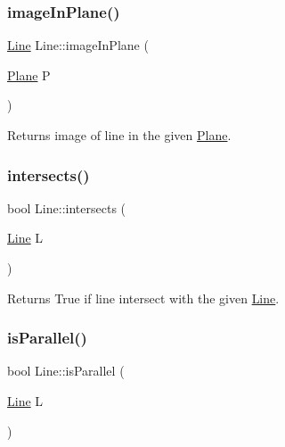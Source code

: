 \mbox{\label{class_line_a12787f5d97b7764c5b1836fb9007fb86}} 
\subsubsection{\texorpdfstring{image\+In\+Plane()}{imageInPlane()}}
{\footnotesize\ttfamily \mbox{\hyperlink{class_line}{Line}} Line\+::image\+In\+Plane (\begin{DoxyParamCaption}\item[{\mbox{\hyperlink{class_plane}{Plane}}}]{P }\end{DoxyParamCaption})}



Returns image of line in the given \mbox{\hyperlink{class_plane}{Plane}}. 

\mbox{\label{class_line_a01b3547f05e338ab7d7a4989d379c432}} 
\subsubsection{\texorpdfstring{intersects()}{intersects()}}
{\footnotesize\ttfamily bool Line\+::intersects (\begin{DoxyParamCaption}\item[{\mbox{\hyperlink{class_line}{Line}}}]{L }\end{DoxyParamCaption})}



Returns True if line intersect with the given \mbox{\hyperlink{class_line}{Line}}. 

\mbox{\label{class_line_a8059ce73fc21fafe0ea87939d7d20895}} 
\subsubsection{\texorpdfstring{is\+Parallel()}{isParallel()}}
{\footnotesize\ttfamily bool Line\+::is\+Parallel (\begin{DoxyParamCaption}\item[{\mbox{\hyperlink{class_line}{Line}}}]{L }\end{DoxyParamCaption})}



